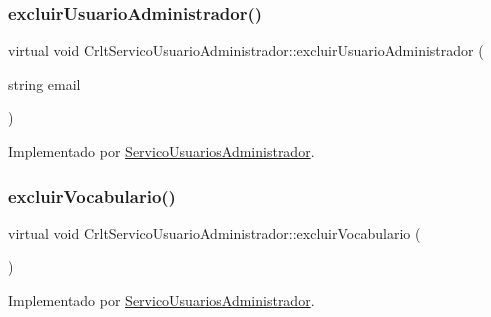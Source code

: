 \subsubsection{\texorpdfstring{excluir\+Usuario\+Administrador()}{excluirUsuarioAdministrador()}}
{\footnotesize\ttfamily virtual void Crlt\+Servico\+Usuario\+Administrador\+::excluir\+Usuario\+Administrador (\begin{DoxyParamCaption}\item[{string}]{email }\end{DoxyParamCaption})\hspace{0.3cm}{\ttfamily [pure virtual]}}



Implementado por \mbox{\hyperlink{class_servico_usuarios_administrador_a1295e808f5e6322a8e329ff711b2b428}{Servico\+Usuarios\+Administrador}}.

\mbox{\label{class_crlt_servico_usuario_administrador_a55d722de48eb016aef0d7290cb36e51d}} 
\subsubsection{\texorpdfstring{excluir\+Vocabulario()}{excluirVocabulario()}}
{\footnotesize\ttfamily virtual void Crlt\+Servico\+Usuario\+Administrador\+::excluir\+Vocabulario (\begin{DoxyParamCaption}{ }\end{DoxyParamCaption})\hspace{0.3cm}{\ttfamily [pure virtual]}}



Implementado por \mbox{\hyperlink{class_servico_usuarios_administrador_a13237b760df88f3f8a825a5bcd1d7331}{Servico\+Usuarios\+Administrador}}.

\mbox{\label{class_crlt_servico_usuario_administrador_af6b9c9eb9a047c0677de25b07062bff5}} 
